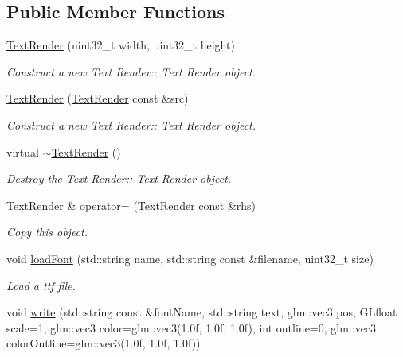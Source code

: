 \subsection*{Public Member Functions}
\begin{DoxyCompactItemize}
\item 
\hyperlink{class_text_render_a57d8bcb3c499312eaf9752b340066e2b}{Text\+Render} (uint32\+\_\+t width, uint32\+\_\+t height)
\begin{DoxyCompactList}\small\item\em Construct a new Text Render\+:\+: Text Render object. \end{DoxyCompactList}\item 
\hyperlink{class_text_render_a019cb58785504de382da100b05a06a36}{Text\+Render} (\hyperlink{class_text_render}{Text\+Render} const \&src)
\begin{DoxyCompactList}\small\item\em Construct a new Text Render\+:\+: Text Render object. \end{DoxyCompactList}\item 
\mbox{\label{class_text_render_a1c0bf422181e9a679ce8b43ebd7315ff}} 
virtual \hyperlink{class_text_render_a1c0bf422181e9a679ce8b43ebd7315ff}{$\sim$\+Text\+Render} ()
\begin{DoxyCompactList}\small\item\em Destroy the Text Render\+:\+: Text Render object. \end{DoxyCompactList}\item 
\hyperlink{class_text_render}{Text\+Render} \& \hyperlink{class_text_render_a598a2b1f47fee7d8bb466e3e656f2446}{operator=} (\hyperlink{class_text_render}{Text\+Render} const \&rhs)
\begin{DoxyCompactList}\small\item\em Copy this object. \end{DoxyCompactList}\item 
void \hyperlink{class_text_render_a61b2b17f3c5ac1d4c9abe657ffa3a573}{load\+Font} (std\+::string name, std\+::string const \&filename, uint32\+\_\+t size)
\begin{DoxyCompactList}\small\item\em Load a ttf file. \end{DoxyCompactList}\item 
void \hyperlink{class_text_render_a12af20faf1e488c6fc99cffc44c0d43b}{write} (std\+::string const \&font\+Name, std\+::string text, glm\+::vec3 pos, G\+Lfloat scale=1, glm\+::vec3 color=glm\+::vec3(1.\+0f, 1.\+0f, 1.\+0f), int outline=0, glm\+::vec3 color\+Outline=glm\+::vec3(1.\+0f, 1.\+0f, 1.\+0f))

\end{DoxyCompactItemize}
